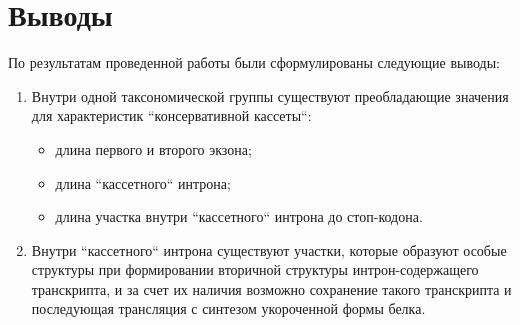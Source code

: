 \clearpage
\section{Выводы}

По результатам проведенной работы были сформулированы следующие выводы:

\begin{enumerate}[left=\parindent]
    \item Внутри одной таксономической группы существуют преобладающие значения для характеристик ``консервативной кассеты``:
    \begin{itemize}
        \item длина первого и второго экзона;
        \item длина ``кассетного`` интрона;
        \item длина участка внутри ``кассетного`` интрона до стоп-кодона.
    \end{itemize}
    \item Внутри ``кассетного`` интрона существуют участки, которые образуют особые структуры при формировании вторичной структуры интрон-содержащего транскрипта, и за счет их наличия возможно сохранение такого транскрипта и последующая трансляция с синтезом укороченной формы белка.
\end{enumerate}
